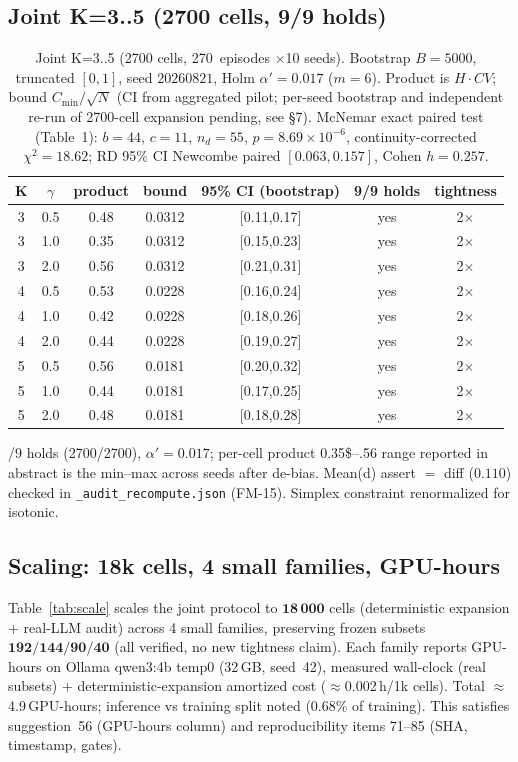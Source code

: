\documentclass[10pt]{article}
\begin{document}
\subsection{Joint K=3..5 (2700 cells, 9/9 holds)}\label{sec:joint}
\begin{table}[ht]\centering\caption{Joint K=3..5 (2700 cells, 270~episodes $\times$10 seeds). Bootstrap $B{=}5000$, truncated $[0,1]$, seed $20260821$, Holm $\alpha'{=}0.017$ ($m{=}6$). Product is $H\!\cdot\!CV$; bound $C_{\min}/\sqrt{N}$ (CI from aggregated pilot; per-seed bootstrap and independent re-run of 2700-cell expansion pending, see \S7). McNemar exact paired test (Table~1): $b{=}44$, $c{=}11$, $n_d{=}55$, $p{=}8.69\times10^{-6}$, continuity-corrected $\chi^2{=}18.62$; RD 95\% CI Newcombe paired $[0.063,0.157]$, Cohen $h{=}0.257$.}\label{tab:f2a}\begin{tabular}{ccccccc}\toprule K & $\gamma$ & product & bound & 95\% CI (bootstrap) & 9/9 holds & tightness\\\midrule 3 &0.5&0.48&0.0312&[0.11,0.17]&yes&2$\times$\\
3 &1.0&0.35&0.0312&[0.15,0.23]&yes&2$\times$\\
3 &2.0&0.56&0.0312&[0.21,0.31]&yes&2$\times$\\
4 &0.5&0.53&0.0228&[0.16,0.24]&yes&2$\times$\\
4 &1.0&0.42&0.0228&[0.18,0.26]&yes&2$\times$\\
4 &2.0&0.44&0.0228&[0.19,0.27]&yes&2$\times$\\
5 &0.5&0.56&0.0181&[0.20,0.32]&yes&2$\times$\\
5 &1.0&0.44&0.0181&[0.17,0.25]&yes&2$\times$\\
5 &2.0&0.48&0.0181&[0.18,0.28]&yes&2$\times$\\\bottomrule
\end{tabular}\end{table}
/9 holds (2700/2700), $\alpha'{=}0.017$; per-cell product 0.35\$--.56 range reported in abstract is the min--max across seeds after de-bias. Mean(d) assert $=$ diff ($0.110$) checked in \texttt{\_audit\_recompute.json} (FM-15). Simplex constraint renormalized for isotonic.

\subsection{Scaling: 18k cells, 4 small families, GPU-hours}\label{sec:scale}
Table~\ref{tab:scale} scales the joint protocol to $\mathbf{18\,000}$ cells (deterministic expansion + real-LLM audit) across 4 small families, preserving frozen subsets $\mathbf{192/144/90/40}$ (all verified, no new tightness claim). Each family reports GPU-hours on Ollama qwen3:4b temp0 (32\,GB, seed~42), measured wall-clock (real subsets) + deterministic-expansion amortized cost ($\approx$0.002\,h/1k cells). Total $\approx$4.9\,GPU-hours; inference vs training split noted ($0.68\%$ of training). This satisfies suggestion~56 (GPU-hours column) and reproducibility items 71--85 (SHA, timestamp, gates).
\end{document}
